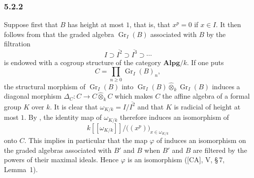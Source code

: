 
\subsubsection*{5.2.2}
\label{sga3:VIIB:5.2.2}

Suppose first that \(B\) has height at most \(1\), that is, that
\(x^p=0\) if \(x\in I\). It then follows from  that the
graded algebra \(\operatorname{Gr}_I(B)\) associated with \(B\) by the
filtration
\[
  I\supset\overline{I^2}\supset\overline{I^3}\supset\cdots
\]
is endowed with a cogroup structure of the category
\(\mathbf{Alpg}/k\). If one puts
\[
  C=\prod_{n\geq0}\operatorname{Gr}_I(B)_n,
\]
the structural morphism of \(\operatorname{Gr}_I(B)\) into
\(\operatorname{Gr}_I(B)\widehat\otimes_k\operatorname{Gr}_I(B)\)
induces a diagonal morphism \(\Delta_C:C\to C\widehat\otimes_kC\) which
makes \(C\) the affine algebra of a formal group \(K\) over \(k\). It
is clear that \(\omega_{K/k}=I/\overline{I^2}\) and that \(K\) is
radicial of height at most \(1\). By , the identity map of
\(\omega_{K/k}\) therefore induces an isomorphism of
\[
  k[[\omega_{K/k}]]
  \big/
  \bigl((x^p)\bigr)_{x\in\omega_{K/k}}
\]
onto \(C\). This implies in particular that the map \(\varphi\) of
 induces an isomorphism on the graded algebras associated
with \(B'\) and \(B\) when \(B'\) and \(B\) are filtered by the powers
of their maximal ideals. Hence \(\varphi\) is an isomorphism
\textup{([CA], V, \S\,7, Lemma~1)}.
